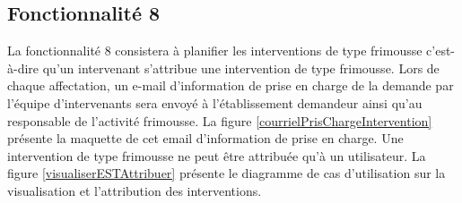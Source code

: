 
\subsection{Fonctionnalité 8}

La fonctionnalité 8 consistera à planifier les interventions de type frimousse c'est-à-dire qu'un intervenant s'attribue une intervention de type frimousse.
Lors de chaque affectation, un e-mail d'information de prise en charge de la demande par l'équipe d'intervenants sera envoyé à l'établissement demandeur ainsi qu'au responsable de l'activité frimousse.
La figure \ref{courrielPrisChargeIntervention} présente la maquette de cet email d'information de prise en charge. 
Une intervention de type frimousse ne peut être attribuée qu'à un utilisateur.
  La figure \ref{visualiserESTAttribuer} présente le diagramme de cas d'utilisation sur la visualisation et l'attribution des interventions.\\
